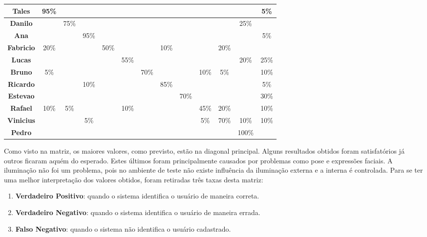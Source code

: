 \begin{table}[htb]
\begin{center}
\begin{tabular}{|c|c|c|c|c|c|c|c|c|c|c|c|c|}
				\hline \bf Tales 		& 95\% & 			& 		 & 			&   	 & 			& 		 & 			& 		 & 			& 		 & 5\%	\\ 
				\hline \bf Danilo 	& 		 & 75\% & 		 & 			&   	 & 			& 		 & 			& 		 & 			& 25\% &		 	\\
				\hline \bf Ana 			& 		 & 			& 95\% & 			&   	 & 			& 		 & 			& 		 & 			& 		 & 5\%  \\
				\hline \bf Fabricio & 20\% & 			& 		 & 50\% &      & 			& 10\% & 			&  	   & 20\% & 		 &		  \\
				\hline \bf Lucas 		& 		 & 			& 		 & 			& 55\% & 			& 		 & 			& 		 & 			& 20\% & 25\% \\
				\hline \bf Bruno 		& 5\%	 & 			& 		 & 			& 		 & 70\% & 		 & 			& 10\% & 	5\%	& 		 & 10\%	\\
				\hline \bf Ricardo 	& 		 & 			& 10\% & 			& 		 & 			& 85\% & 			& 		 & 			& 		 & 5\%  \\
				\hline \bf Estevao 	& 		 & 			& 		 & 			& 		 & 			& 		 & 70\% & 		 & 			& 		 & 30\% \\
				\hline \bf Rafael 	& 10\% & 	5\%	& 		 & 			& 10\% & 			& 		 & 			& 45\% & 20\% & 		 & 10\% \\
				\hline \bf Vinicius & 		 & 			& 5\%  & 			& 		 & 			& 		 & 			& 5\%  & 70\% & 10\% & 10\% \\
				\hline \bf Pedro 		& 		 & 			& 		 & 			& 		 & 			& 		 & 			& 		 & 			& 100\%&		  \\
				\hline
			\end{tabular}
		\end{center}
	\end{table}

	Como visto na matriz, os maiores valores, como previsto, estão na diagonal
	principal. Alguns resultados obtidos foram satisfatórios já outros ficaram
	aquém do esperado. Estes últimos foram principalmente causados por problemas como pose e expressões faciais. A iluminação não foi um problema,
	pois no ambiente de teste não existe influência da iluminação externa e a
	interna é controlada. Para se ter uma melhor interpretação dos valores obtidos,
	foram retiradas três taxas desta matriz:

	\begin{enumerate}
		\item \textbf{Verdadeiro Positivo}: quando o sistema identifica o usuário de maneira correta.
		\item \textbf{Verdadeiro Negativo}: quando o sistema identifica o usuário de maneira errada.
		\item \textbf{Falso Negativo}: quando o sistema não identifica o usuário cadastrado.
	\end{enumerate}

